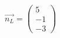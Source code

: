 \documentclass[preview]{standalone}
\begin{document}
\begin{center}
$\vec{n_L} = \begin{pmatrix} 5 \\ -1 \\ -3 \end{pmatrix}$
\end{center}
\end{document}
